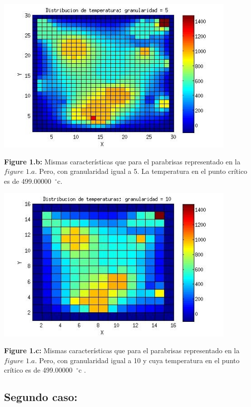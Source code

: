 \documentclass[a4paper]{article}
\begin{document}
\includegraphics[width=\textwidth,height=3.0in,keepaspectratio
]{140x140h5.jpg} \newline
\begin {flushleft}
\textbf{Figure 1.b:} Mismas características que para el parabrisas representado en la $figure$ $1.a$. Pero, con granularidad igual a 5. La temperatura en el punto crítico es de 499.00000\hspace{-1.5mm}$\phantom{a}^{\circ}$c.
\end{flushleft}


\includegraphics[width=\textwidth,height=3.0in,keepaspectratio
]{140x140h10.jpg} \newline
\begin {flushleft}
\textbf{Figure 1.c:} Mismas características que para el parabrisas representado en la $figure$ $1.a$. Pero, con granularidad igual a 10 y cuya temperatura en el punto crítico es de 499.00000\hspace{-1.5mm}$\phantom{a}^{\circ}$c .
\end{flushleft}


\subsection{Segundo caso:}
\end{document}
